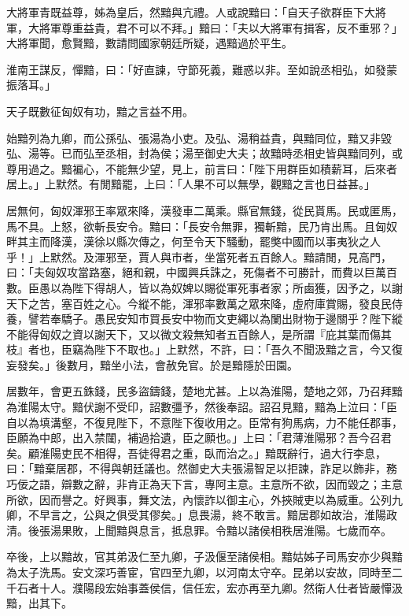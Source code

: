 \begin{pinyinscope}
大將軍青既益尊，姊為皇后，然黯與亢禮。人或說黯曰：「自天子欲群臣下大將軍，大將軍尊重益貴，君不可以不拜。」黯曰：「夫以大將軍有揖客，反不重邪？」大將軍聞，愈賢黯，數請問國家朝廷所疑，遇黯過於平生。

淮南王謀反，憚黯，曰：「好直諫，守節死義，難惑以非。至如說丞相弘，如發蒙振落耳。」

天子既數征匈奴有功，黯之言益不用。

始黯列為九卿，而公孫弘、張湯為小吏。及弘、湯稍益貴，與黯同位，黯又非毀弘、湯等。已而弘至丞相，封為侯；湯至御史大夫；故黯時丞相史皆與黯同列，或尊用過之。黯褊心，不能無少望，見上，前言曰：「陛下用群臣如積薪耳，后來者居上。」上默然。有閒黯罷，上曰：「人果不可以無學，觀黯之言也日益甚。」

居無何，匈奴渾邪王率眾來降，漢發車二萬乘。縣官無錢，從民貰馬。民或匿馬，馬不具。上怒，欲斬長安令。黯曰：「長安令無罪，獨斬黯，民乃肯出馬。且匈奴畔其主而降漢，漢徐以縣次傳之，何至令天下騷動，罷獘中國而以事夷狄之人乎！」上默然。及渾邪至，賈人與市者，坐當死者五百餘人。黯請閒，見高門，曰：「夫匈奴攻當路塞，絕和親，中國興兵誅之，死傷者不可勝計，而費以巨萬百數。臣愚以為陛下得胡人，皆以為奴婢以賜從軍死事者家；所鹵獲，因予之，以謝天下之苦，塞百姓之心。今縱不能，渾邪率數萬之眾來降，虛府庫賞賜，發良民侍養，譬若奉驕子。愚民安知市買長安中物而文吏繩以為闌出財物于邊關乎？陛下縱不能得匈奴之資以謝天下，又以微文殺無知者五百餘人，是所謂『庇其葉而傷其枝』者也，臣竊為陛下不取也。」上默然，不許，曰：「吾久不聞汲黯之言，今又復妄發矣。」後數月，黯坐小法，會赦免官。於是黯隱於田園。

居數年，會更五銖錢，民多盜鑄錢，楚地尤甚。上以為淮陽，楚地之郊，乃召拜黯為淮陽太守。黯伏謝不受印，詔數彊予，然後奉詔。詔召見黯，黯為上泣曰：「臣自以為填溝壑，不復見陛下，不意陛下復收用之。臣常有狗馬病，力不能任郡事，臣願為中郎，出入禁闥，補過拾遺，臣之願也。」上曰：「君薄淮陽邪？吾今召君矣。顧淮陽吏民不相得，吾徒得君之重，臥而治之。」黯既辭行，過大行李息，曰：「黯棄居郡，不得與朝廷議也。然御史大夫張湯智足以拒諫，詐足以飾非，務巧佞之語，辯數之辭，非肯正為天下言，專阿主意。主意所不欲，因而毀之；主意所欲，因而譽之。好興事，舞文法，內懷詐以御主心，外挾賊吏以為威重。公列九卿，不早言之，公與之俱受其僇矣。」息畏湯，終不敢言。黯居郡如故治，淮陽政清。後張湯果敗，上聞黯與息言，抵息罪。令黯以諸侯相秩居淮陽。七歲而卒。

卒後，上以黯故，官其弟汲仁至九卿，子汲偃至諸侯相。黯姑姊子司馬安亦少與黯為太子洗馬。安文深巧善宦，官四至九卿，以河南太守卒。昆弟以安故，同時至二千石者十人。濮陽段宏始事蓋侯信，信任宏，宏亦再至九卿。然衛人仕者皆嚴憚汲黯，出其下。


\end{pinyinscope}
